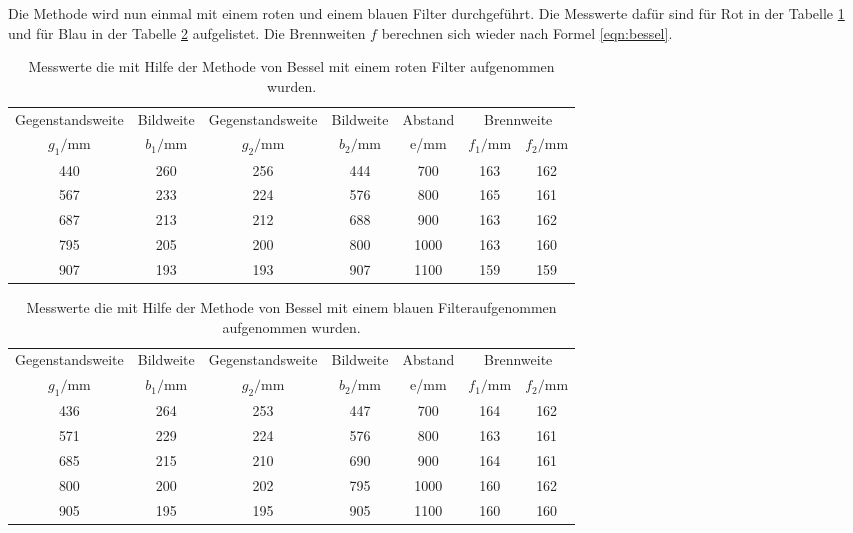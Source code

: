 Die Methode wird nun einmal mit einem roten und einem blauen Filter durchgeführt.
Die Messwerte dafür sind für Rot in der Tabelle \ref{tab:rot} und für Blau
in der Tabelle \ref{tab:blau} aufgelistet.
Die Brennweiten $f$ berechnen sich wieder nach Formel \eqref{eqn:bessel}.

\begin{table}
    \centering
    \caption{Messwerte die mit Hilfe der Methode von Bessel mit einem roten Filter aufgenommen wurden.}
    \label{tab:rot}
    \begin{tabular}{c c c c c c c}
    \toprule
    Gegenstandsweite   & Bildweite &  Gegenstandsweite   & Bildweite & Abstand  & \multicolumn{2}{c}{Brennweite}\\
    $g_1/\si{\milli\meter}$ & $b_1/\si{\milli\meter}$ &$g_2/\si{\milli\meter}$ & $b_2/\si{\milli\meter}$ & e/\si{\milli\meter} & $f_1/\si{\milli\meter}$ & $f_2/\si{\milli\meter}$\\
    \midrule
    440 & 260 & 256 & 444 & 700  & 163  & 162 \\
    567 & 233 & 224 & 576 & 800  & 165  & 161 \\
    687 & 213 & 212 & 688 & 900  & 163  & 162 \\
    795 & 205 & 200 & 800 & 1000 & 163  & 160 \\
    907 & 193 & 193 & 907 & 1100 & 159  & 159 \\
    \bottomrule
\end{tabular}
\end{table}
\FloatBarrier

\begin{table}
    \centering
    \caption{Messwerte die mit Hilfe der Methode von Bessel mit einem blauen Filteraufgenommen aufgenommen wurden.}
    \label{tab:blau}
    \begin{tabular}{c c c c c c c}
    \toprule
    Gegenstandsweite   & Bildweite &  Gegenstandsweite   & Bildweite & Abstand  & \multicolumn{2}{c}{Brennweite}\\
    $g_1/\si{\milli\meter}$ & $b_1/\si{\milli\meter}$ &$g_2/\si{\milli\meter}$ & $b_2/\si{\milli\meter}$ & e/\si{\milli\meter} & $f_1/\si{\milli\meter}$ & $f_2/\si{\milli\meter}$\\
    \midrule
    436  & 264  &  253  &  447  &  700  & 164 & 162 \\
    571  & 229  &  224  &  576  &  800  & 163 & 161 \\
    685  & 215  &  210  &  690  &  900  & 164 & 161 \\
    800  & 200  &  202  &  795  &  1000 & 160 & 162 \\
    905  & 195  &  195  &  905  &  1100 & 160 & 160 \\
    \bottomrule
  \end{tabular}
\end{table}
\FloatBarrier

